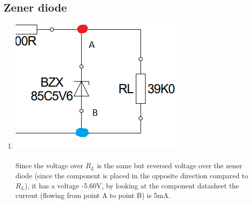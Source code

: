 \documentclass{article}
\begin{document}
			\subsection{Zener diode}
				\begin{enumerate}
					
					\item  \includegraphics[scale=0.75]{zener diode}\\\\
					Since the voltage over \(R_L\) is the same but reversed voltage over the zener diode (since the component is placed in the opposite direction compared to \(R_L\)), it has a voltage -5.60V, by looking at the component datasheet the current (flowing from point A to point B) is 5mA.
				\end{enumerate}
\end{document}
